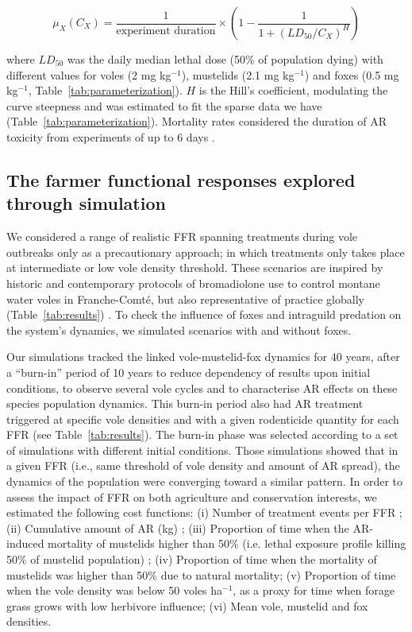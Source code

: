 \documentclass[11pt]{article}
\begin{document}
\begin{equation}
\mu_X(C_X) = \dfrac{1}{\text{experiment duration}} \times \left( 1- \dfrac{1}{1+ (LD_{50}/C_X)^H} \right) 
\label{eq:muX}
\end{equation}

where $LD_{50}$ was the daily median lethal dose (50\% of population dying) with different values for voles (2 mg kg$^{-1}$), mustelids (2.1 mg kg$^{-1}$) and foxes (0.5 mg kg$^{-1}$, Table~\ref{tab:parameterization}). $H$ is the Hill's coefficient, modulating the curve steepness and was estimated to fit the sparse data we have (Table~\ref{tab:parameterization}). Mortality rates considered the duration of AR toxicity from experiments of up to 6 days \citep{Sage2010}.

\subsection{The farmer functional responses explored through simulation}

We considered a range of realistic FFR spanning treatments during vole outbreaks only as a precautionary approach; in which treatments only takes place at intermediate or low vole density threshold. These scenarios are inspired by historic and contemporary protocols of bromadiolone use to control montane water voles in Franche-Comté, but also representative of practice globally (Table~\ref{tab:results}) \citep{Delattre2009}. To check the influence of foxes and intraguild predation on the system’s dynamics, we simulated scenarios with and without foxes.

Our simulations tracked the linked vole-mustelid-fox dynamics for 40 years, after a “burn-in” period of 10 years to reduce dependency of results upon initial conditions, to observe several vole cycles and to characterise AR effects on these species population dynamics. This burn-in period also had AR treatment triggered at specific vole densities and with a given rodenticide quantity for each FFR (see Table~\ref{tab:results}). The burn-in phase was selected according to a set of simulations with different initial conditions. Those simulations showed that in a given FFR (i.e., same threshold of vole density and amount of AR spread), the dynamics of the population were converging toward a similar pattern. 
In order to assess the impact of FFR on both agriculture and conservation interests, we estimated the following cost functions: (i) Number of treatment events per FFR ; (ii) Cumulative amount of AR (kg) ; (iii) Proportion of time when the AR-induced mortality of mustelids higher than 50\% (i.e. lethal exposure profile killing 50\% of mustelid population) ; (iv) Proportion of time when the mortality of mustelids was higher than 50\% due to natural mortality; (v) Proportion of time when the vole density was below 50 voles ha$^{-1}$, as a proxy for time when forage grass grows with low herbivore influence; (vi) Mean vole, mustelid and fox densities.
\end{document}
